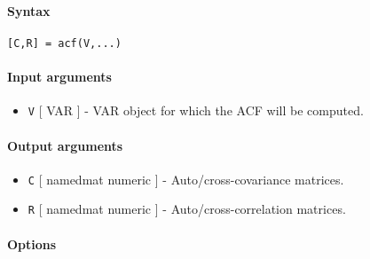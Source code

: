 


	\paragraph{Syntax}\label{syntax}

\begin{verbatim}
[C,R] = acf(V,...)
\end{verbatim}

\paragraph{Input arguments}\label{input-arguments}

\begin{itemize}
\itemsep1pt\parskip0pt
\item
  \texttt{V} {[} VAR {]} - VAR object for which the ACF will be
  computed.
\end{itemize}

\paragraph{Output arguments}\label{output-arguments}

\begin{itemize}
\item
  \texttt{C} {[} namedmat \textbar{} numeric {]} - Auto/cross-covariance
  matrices.
\item
  \texttt{R} {[} namedmat \textbar{} numeric {]} -
  Auto/cross-correlation matrices.
\end{itemize}

\paragraph{Options}\label{options}


